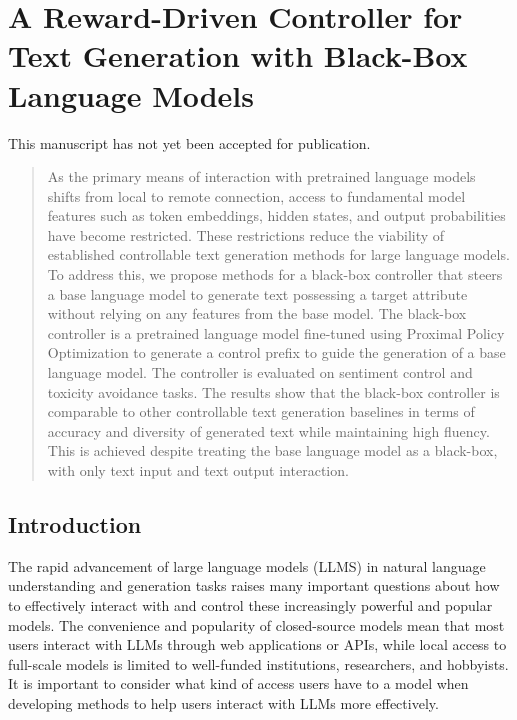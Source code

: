 \documentclass[phd,electronic,oneside,twosidetoc,letterpaper,chaptercenter,parttop,lof]{byumsphd}
\begin{document}
\chapter{A Reward-Driven Controller for Text Generation with Black-Box Language Models}
\label{chap:bbc}

This manuscript has not yet been accepted for publication.  

\begin{abstract}
As the primary means of interaction with pretrained language models shifts from local to remote connection, access to fundamental model features such as token embeddings, hidden states, and output probabilities have become restricted.
These restrictions reduce the viability of established controllable text generation methods for large language models.
To address this, we propose methods for a black-box controller that steers a base language model to generate text possessing a target attribute without relying on any features from the base model.
The black-box controller is a pretrained language model fine-tuned using Proximal Policy Optimization to generate a control prefix to guide the generation of a base language model.
The controller is evaluated on sentiment control and toxicity avoidance tasks.
The results show that the black-box controller is comparable to other controllable text generation baselines in terms of accuracy and diversity of generated text while maintaining high fluency.
This is achieved despite treating the base language model as a black-box, with only text input and text output interaction.
\end{abstract}



\section{Introduction}
\label{introduction}

The rapid advancement of large language models (LLMS) in natural language understanding and generation tasks \citep{brown2020gpt3, touvron2023llama, ziegler2019preferences, ouyang2022rlhf, deepseek2025r1} raises many important questions about how to effectively interact with and control these increasingly powerful and popular models.
The convenience and popularity of closed-source models mean that most users interact with LLMs through web applications or APIs, while local access to full-scale models is limited to well-funded institutions, researchers, and hobbyists.
It is important to consider what kind of access users have to a model when developing methods to help users interact with LLMs more effectively.
\end{document}
